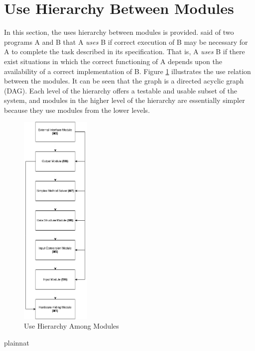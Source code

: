 \documentclass[12pt, titlepage]{article}
\begin{document}
\section{Use Hierarchy Between Modules} \label{SecUse}
In this section, the uses hierarchy between modules is
provided. \citet{Parnas1978} said of two programs A and B that A {\em uses} B if
correct execution of B may be necessary for A to complete the task described in
its specification. That is, A {\em uses} B if there exist situations in which
the correct functioning of A depends upon the availability of a correct
implementation of B.  Figure \ref{FigUH} illustrates the use relation between
the modules. It can be seen that the graph is a directed acyclic graph
(DAG). Each level of the hierarchy offers a testable and usable subset of the
system, and modules in the higher level of the hierarchy are essentially simpler
because they use modules from the lower levels.

\begin{figure}[H]
\centering
\includegraphics[width=0.3\textwidth]{UsesHierarchy.png}
\caption{Use Hierarchy Among Modules}
\label{FigUH}
\end{figure}


\newpage

 {plainnat}

\end{document}
